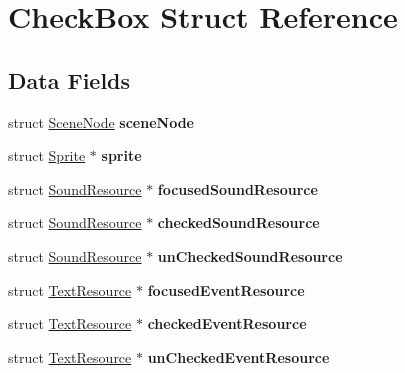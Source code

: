 \hypertarget{struct_check_box}{}\section{Check\+Box Struct Reference}
\label{struct_check_box}
\subsection*{Data Fields}
\begin{DoxyCompactItemize}
\item 
\hypertarget{struct_check_box_aca8025f56fb4ce20b974ec9a3292a9e4}{}\label{struct_check_box_aca8025f56fb4ce20b974ec9a3292a9e4} 
struct \hyperlink{struct_scene_node}{Scene\+Node} {\bfseries scene\+Node}
\item 
\hypertarget{struct_check_box_a1128327f94baacb1570a98fca0591108}{}\label{struct_check_box_a1128327f94baacb1570a98fca0591108} 
struct \hyperlink{struct_sprite}{Sprite} $\ast$ {\bfseries sprite}
\item 
\hypertarget{struct_check_box_a8848ee5b886f588a966fc6c3ff0270df}{}\label{struct_check_box_a8848ee5b886f588a966fc6c3ff0270df} 
struct \hyperlink{struct_sound_resource}{Sound\+Resource} $\ast$ {\bfseries focused\+Sound\+Resource}
\item 
\hypertarget{struct_check_box_ac6c8715d0371c2a1d98681db939c703c}{}\label{struct_check_box_ac6c8715d0371c2a1d98681db939c703c} 
struct \hyperlink{struct_sound_resource}{Sound\+Resource} $\ast$ {\bfseries checked\+Sound\+Resource}
\item 
\hypertarget{struct_check_box_a1f2f9e6f5ef31b187c2da989b179d151}{}\label{struct_check_box_a1f2f9e6f5ef31b187c2da989b179d151} 
struct \hyperlink{struct_sound_resource}{Sound\+Resource} $\ast$ {\bfseries un\+Checked\+Sound\+Resource}
\item 
\hypertarget{struct_check_box_aff7dcf845e86b8d62077ceec6094f3e3}{}\label{struct_check_box_aff7dcf845e86b8d62077ceec6094f3e3} 
struct \hyperlink{struct_text_resource}{Text\+Resource} $\ast$ {\bfseries focused\+Event\+Resource}
\item 
\hypertarget{struct_check_box_a141e6071f8fcb7d05f669cb32022bdc3}{}\label{struct_check_box_a141e6071f8fcb7d05f669cb32022bdc3} 
struct \hyperlink{struct_text_resource}{Text\+Resource} $\ast$ {\bfseries checked\+Event\+Resource}
\item 
\hypertarget{struct_check_box_ae214e71201e1e7a27db408e05f019cbd}{}\label{struct_check_box_ae214e71201e1e7a27db408e05f019cbd} 
struct \hyperlink{struct_text_resource}{Text\+Resource} $\ast$ {\bfseries un\+Checked\+Event\+Resource}

\end{DoxyCompactItemize}
